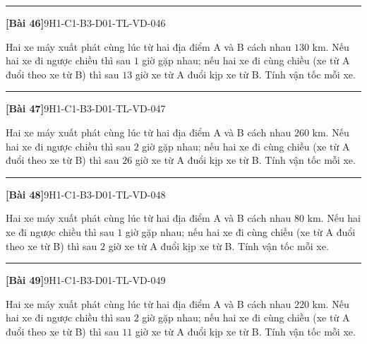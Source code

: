 \documentclass[12pt,a4paper]{article}
\newif\ifloigiai
\newenvironment{cauhoi}[2]{%
  \par\medskip\noindent\rule{\textwidth}{0.4pt}\par\nopagebreak
  \noindent\textbf{[#1]}\hfill{\scriptsize\ttfamily #2}\par\nopagebreak\smallskip}{\par}
\newcommand{\loigiai}[1]{\ifloigiai\par\smallskip\noindent\textit{Lời giải.} #1\par\fi}
\begin{document}
\begin{cauhoi}{Bài 46}{9H1-C1-B3-D01-TL-VD-046}
Hai xe máy xuất phát cùng lúc từ hai địa điểm A và B cách nhau $130$ km. Nếu hai xe đi ngược chiều thì sau $1$ giờ gặp nhau; nếu hai xe đi cùng chiều (xe từ A đuổi theo xe từ B) thì sau $13$ giờ xe từ A đuổi kịp xe từ B. Tính vận tốc mỗi xe.
\loigiai{Gọi vận tốc xe từ A là $x$ (km/h) và xe từ B là $y$ (km/h), $x>y>0$. Đi ngược chiều: $(x+y)=130$, tức là $x+y=130$. Đi cùng chiều: $13(x-y)=130$, tức là $x-y=10$. Giải hệ ta được $x=70$, $y=60$ (thoả mãn). Vậy vận tốc xe từ A là 70 km/h, xe từ B là 60 km/h.}
\end{cauhoi}
\begin{cauhoi}{Bài 47}{9H1-C1-B3-D01-TL-VD-047}
Hai xe máy xuất phát cùng lúc từ hai địa điểm A và B cách nhau $260$ km. Nếu hai xe đi ngược chiều thì sau $2$ giờ gặp nhau; nếu hai xe đi cùng chiều (xe từ A đuổi theo xe từ B) thì sau $26$ giờ xe từ A đuổi kịp xe từ B. Tính vận tốc mỗi xe.
\loigiai{Gọi vận tốc xe từ A là $x$ (km/h) và xe từ B là $y$ (km/h), $x>y>0$. Đi ngược chiều: $2(x+y)=260$, tức là $x+y=130$. Đi cùng chiều: $26(x-y)=260$, tức là $x-y=10$. Giải hệ ta được $x=70$, $y=60$ (thoả mãn). Vậy vận tốc xe từ A là 70 km/h, xe từ B là 60 km/h.}
\end{cauhoi}
\begin{cauhoi}{Bài 48}{9H1-C1-B3-D01-TL-VD-048}
Hai xe máy xuất phát cùng lúc từ hai địa điểm A và B cách nhau $80$ km. Nếu hai xe đi ngược chiều thì sau $1$ giờ gặp nhau; nếu hai xe đi cùng chiều (xe từ A đuổi theo xe từ B) thì sau $2$ giờ xe từ A đuổi kịp xe từ B. Tính vận tốc mỗi xe.
\loigiai{Gọi vận tốc xe từ A là $x$ (km/h) và xe từ B là $y$ (km/h), $x>y>0$. Đi ngược chiều: $(x+y)=80$, tức là $x+y=80$. Đi cùng chiều: $2(x-y)=80$, tức là $x-y=40$. Giải hệ ta được $x=60$, $y=20$ (thoả mãn). Vậy vận tốc xe từ A là 60 km/h, xe từ B là 20 km/h.}
\end{cauhoi}
\begin{cauhoi}{Bài 49}{9H1-C1-B3-D01-TL-VD-049}
Hai xe máy xuất phát cùng lúc từ hai địa điểm A và B cách nhau $220$ km. Nếu hai xe đi ngược chiều thì sau $2$ giờ gặp nhau; nếu hai xe đi cùng chiều (xe từ A đuổi theo xe từ B) thì sau $11$ giờ xe từ A đuổi kịp xe từ B. Tính vận tốc mỗi xe.
\loigiai{Gọi vận tốc xe từ A là $x$ (km/h) và xe từ B là $y$ (km/h), $x>y>0$. Đi ngược chiều: $2(x+y)=220$, tức là $x+y=110$. Đi cùng chiều: $11(x-y)=220$, tức là $x-y=20$. Giải hệ ta được $x=65$, $y=45$ (thoả mãn). Vậy vận tốc xe từ A là 65 km/h, xe từ B là 45 km/h.}
\end{cauhoi}
\end{document}
